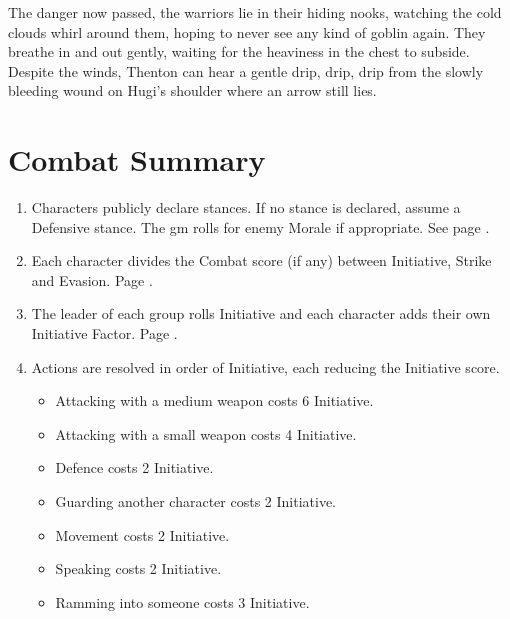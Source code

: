 \begin{multicols}{2}
{\begin{exampletext}
	The danger now passed, the warriors lie in their hiding nooks, watching the cold clouds whirl around them, hoping to never see any kind of goblin again.
	They breathe in and out gently, waiting for the heaviness in the chest to subside. Despite the winds, Thenton can hear a gentle drip, drip, drip from the slowly bleeding wound on Hugi's shoulder where an arrow still lies.
	\end{exampletext}
}{}

\end{multicols}

\section{Combat Summary}

\begin{multicols}{2}

\begin{enumerate}
	\item{Characters publicly declare stances. If no stance is declared, assume a Defensive stance. The \gls{gm} rolls for enemy Morale if appropriate.
	See page \pageref{stances}.}
	\item{Each character divides the Combat score (if any) between Initiative, Strike and Evasion. Page \pageref{combat_factor}.}
	\item{The leader of each group rolls Initiative and each character adds their own Initiative Factor. Page \pageref{initiative}.}
	\item{Actions are resolved in order of Initiative, each reducing the Initiative score.}
	\begin{itemize}
		\item{Attacking with a medium weapon costs 6 Initiative.}
		\item{Attacking with a small weapon costs 4 Initiative.}
		\item{Defence costs 2 Initiative.}
		\item{Guarding another character costs 2 Initiative.}
		\item{Movement costs 2 Initiative.}
		\item{Speaking costs 2 Initiative.}
		\item{Ramming into someone costs 3 Initiative.}
	\end{itemize}
\end{enumerate}

\end{multicols}

\stopcontents[Combat]
